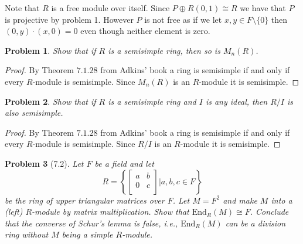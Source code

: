 \documentclass[10pt]{article}
\newcommand{\sk}{\vskip 10mm}
\theoremstyle{plain}
\newtheorem{problem}{Problem}
\theoremstyle{remark}
\begin{document}
Note that $R$ is a free module over itself. Since $P\oplus R(0,1)\cong R$
we have that $P$ is projective by problem 1. However $P$ is
not free as if we let $x,y\in F\setminus\{0\}$ then $(0,y)\cdot(x,0)=0$ even
though neither element is zero.

\sk

\begin{problem}
  Show that if $R$ is a semisimple ring, then so is $M_n(R)$.
\end{problem}

\begin{proof}
  By Theorem $7.1.28$ from Adkins' book a ring is semisimple if and
  only if every $R$-module is semisimple. Since $M_n(R)$ is an $R$-module
  it is semisimple.
\end{proof}

\sk

\begin{problem}
  Show that if $R$ is a semisimple ring and $I$ is any ideal, then $R/I$
  is also semisimple.
\end{problem}

\begin{proof}
  By Theorem $7.1.28$ from Adkins' book a ring is semisimple if and
  only if every $R$-module is semisimple. Since $R/I$ is an $R$-module
  it is semisimple.
\end{proof}

\sk

\begin{problem}[7.2]
  Let $F$ be a field and let
  \[
    R =
    \left\{
      \left[
        \begin{array}{cc}
          a&b\\
          0&c\\
        \end{array}
      \right]
      |
      a,b,c\in F
    \right\}
  \]
  be the ring of upper triangular matrices over $F$. Let $M=F^2$ and make
  $M$ into a (left) $R$-module by matrix multiplication. Show that
  $\text{End}_R(M)\cong F$. Conclude that the converse of Schur's lemma
  is false, i.e., $\text{End}_R(M)$ can be a division ring without
  $M$ being a simple $R$-module.
\end{problem}
\end{document}

